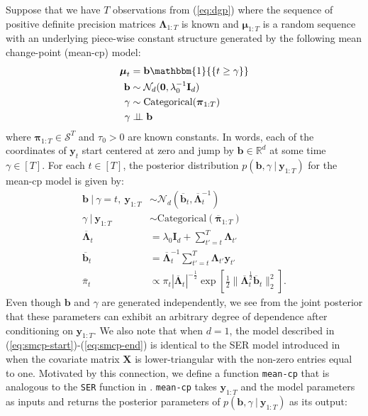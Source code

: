 Suppose that we have $T$ observations from (\ref{eq:dgp}) where the sequence of positive definite precision matrices $\boldsymbol{\Lambda}_{1:T}$ is known and $\boldsymbol{\mu}_{1:T}$ is a random sequence with an underlying piece-wise constant structure generated by the following mean change-point (mean-cp) model:
\begin{align} \label{eq:smcp-start}
    \boldsymbol{\mu}_t &= \mathbf{b}\mathbbm{1}{\left\{t\geq \gamma \right\}} \\
    \mathbf{b} &\sim \mathcal{N}_d(\mathbf{0},\lambda_0^{-1} \mathbf{I}_d) \\
    \gamma &\sim \text{Categorical}(\boldsymbol{\pi}_{1:T})  \\
    \gamma &\indep \mathbf{b} 
    \label{eq:smcp-end}
\end{align}
where $\boldsymbol{\pi}_{1:T} \in \mathcal{S}^T $ and $\tau_0 > 0$ are known constants. In words, each of the coordinates of $\mathbf{y}_{t}$ start centered at zero and jump by $\mathbf{b}\in\mathbb{R}^d$ at some time $\gamma \in [T]$. For each $t \in [T]$, the posterior distribution $p(\mathbf{b}, \gamma \:|\: \mathbf{y}_{1:T})$ for the mean-cp model is given by:
\begin{align}
    \mathbf{b} \:|\: \gamma = t, \: \mathbf{y}_{1:T} &\sim \mathcal{N}_d\left(\overline{\mathbf{b}}_{t}, \overline{\boldsymbol{\Lambda}}_{t}^{-1}\right) \label{eq:b-smcp} \\
    \gamma \:|\: \mathbf{y}_{1:T} &\sim \text{Categorical}(\overline{\boldsymbol{\pi}}_{1:T}) \label{eq:gamma-smcp} \\
    \overline{\boldsymbol{\Lambda}}_t &= \lambda_0\mathbf{I}_d + \sum_{t'=t}^{T} \boldsymbol{\Lambda}_{t'} \\
    \overline{\mathbf{b}}_t &=  \overline{\boldsymbol{\Lambda}}_{t}^{-1}\sum_{t'=t}^{T} \boldsymbol{\Lambda}_{t'} \mathbf{y}_{t'} \\
    \overline{\pi}_t &\propto \pi_t|\overline{\boldsymbol{\Lambda}}_t|^{-
    \frac{1}{2}}\exp\left[\frac{1}{2}\lVert \overline{\boldsymbol{\Lambda}}^{\frac{1}{2}}_t \overline{\mathbf{b}}_t\rVert_2^2\right].
\end{align}
Even though $\mathbf{b}$ and $\gamma$ are generated independently, we see from the joint posterior that these parameters can exhibit an arbitrary degree of dependence after conditioning on $\mathbf{y}_{1:T}$. We also note that when $d = 1$, the model described in (\ref{eq:smcp-start})-(\ref{eq:smcp-end}) is identical to the SER model introduced in \cite{Wang20} when the covariate matrix $\mathbf{X}$ is lower-triangular with the non-zero entries equal to one. Motivated by this connection, we define a function \texttt{mean-cp} that is analogous to the \texttt{SER} function in \cite{Wang20}. \texttt{mean-cp} takes $\mathbf{y}_{1:T}$ and the model parameters as inputs and returns the posterior parameters of $p(\mathbf{b}, \gamma\:|\:\mathbf{y}_{1:T})$ as its output: 
